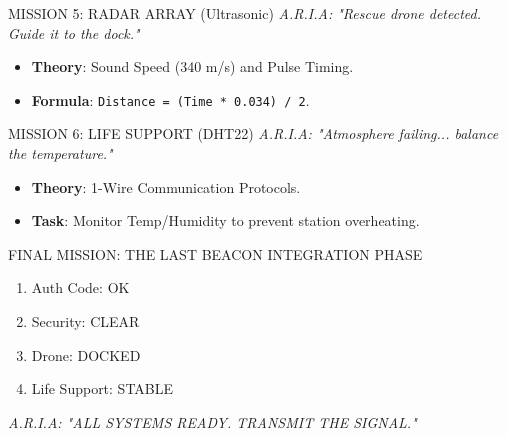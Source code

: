 \documentclass[aspectratio=169]{beamer}
\begin{document}
\begin{frame}{MISSION 5: RADAR ARRAY (Ultrasonic)}
    \textit{A.R.I.A: "Rescue drone detected. Guide it to the dock."}
    \begin{itemize}
        \item \textbf{Theory}: Sound Speed (340 m/s) and Pulse Timing.
        \item \textbf{Formula}: \texttt{Distance = (Time * 0.034) / 2}.
    \end{itemize}
\end{frame}

\begin{frame}{MISSION 6: LIFE SUPPORT (DHT22)}
    \textit{A.R.I.A: "Atmosphere failing... balance the temperature."}
    \begin{itemize}
        \item \textbf{Theory}: 1-Wire Communication Protocols.
        \item \textbf{Task}: Monitor Temp/Humidity to prevent station overheating.
    \end{itemize}
\end{frame}

\begin{frame}{FINAL MISSION: THE LAST BEACON}
    \centering
    \Huge \textcolor{IoTCyan}{INTEGRATION PHASE}
    \vspace{0.5cm}
    \large
    \begin{enumerate}
        \item Auth Code: OK
        \item Security: CLEAR
        \item Drone: DOCKED
        \item Life Support: STABLE
    \end{enumerate}
    \textit{A.R.I.A: "ALL SYSTEMS READY. TRANSMIT THE SIGNAL."}
\end{frame}
\end{document}
